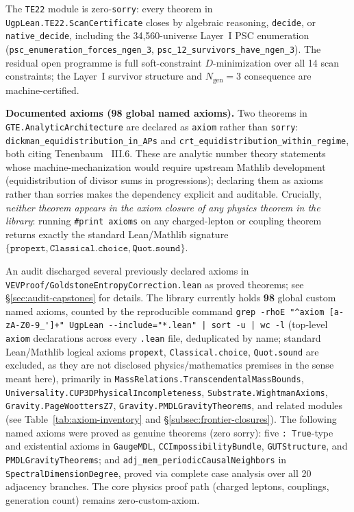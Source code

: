 \documentclass[11pt,a4paper]{article}
\theoremstyle{definition}
\begin{document}
The \texttt{TE22} module is zero-\texttt{sorry}: every theorem in
\texttt{UgpLean.TE22.ScanCertificate} closes by algebraic reasoning,
\texttt{decide}, or \texttt{native\_decide}, including the 34,560-universe
Layer~I PSC enumeration (\texttt{psc\_enumeration\_forces\_ngen\_3},
\texttt{psc\_12\_survivors\_have\_ngen\_3}).  The residual open programme is
full soft-constraint $D$-minimization over all 14 scan constraints; the
Layer~I survivor structure and $N_{\mathrm{gen}} = 3$ consequence are
machine-certified.

\medskip\noindent\textbf{Documented axioms (98 global named axioms).}
Two theorems in \texttt{GTE.AnalyticArchitecture} are declared as
\texttt{axiom} rather than \texttt{sorry}: \texttt{dickman\_equidistribution\_in\_APs}
and \texttt{crt\_equidistribution\_within\_regime}, both citing
Tenenbaum~\cite{Tenenbaum} III.6.  These are analytic number theory
statements whose machine-mechanization would require upstream Mathlib
development (equidistribution of divisor sums in progressions);
declaring them as axioms rather than sorries makes the dependency explicit
and auditable.  Crucially, \emph{neither theorem appears in the axiom
closure of any physics theorem in the library}: running
\texttt{\#print axioms} on any charged-lepton or coupling theorem
returns exactly the standard Lean/Mathlib signature
$\{\mathtt{propext},\mathtt{Classical.choice},\mathtt{Quot.sound}\}$.

An audit discharged several previously declared axioms in
\texttt{VEVProof/GoldstoneEntropyCorrection.lean} as proved theorems;
see \S\ref{sec:audit-capstones} for details.
The library currently holds \textbf{98} global custom named axioms,
counted by the reproducible command
\lstinline!grep -rhoE "^axiom [a-zA-Z0-9_']+" UgpLean --include="*.lean" | sort -u | wc -l!
(top-level \texttt{axiom} declarations across every \texttt{.lean} file, deduplicated by
name; standard Lean/Mathlib logical axioms \texttt{propext}, \texttt{Classical.choice},
\texttt{Quot.sound} are excluded, as they are not disclosed physics/mathematics premises
in the sense meant here), primarily in \texttt{MassRelations.TranscendentalMassBounds},
\texttt{Universality.CUP3DPhysicalIncompleteness}, \texttt{Substrate.WightmanAxioms},
\texttt{Gravity.PageWoottersZ7}, \texttt{Gravity.PMDLGravityTheorems}, and related
modules (see Table~\ref{tab:axiom-inventory} and \S\ref{subsec:frontier-closures}).
The following named axioms were proved as genuine theorems (zero sorry):
five \lstinline|: True|-type and existential axioms in \texttt{GaugeMDL},
\texttt{CCImpossibilityBundle}, \texttt{GUTStructure}, and \texttt{PMDLGravityTheorems};
and \lstinline|adj_mem_periodicCausalNeighbors| in \texttt{SpectralDimensionDegree},
proved via complete case analysis over all 20 adjacency branches.
The core physics proof path (charged leptons, couplings, generation count) remains
zero-custom-axiom.
\end{document}
